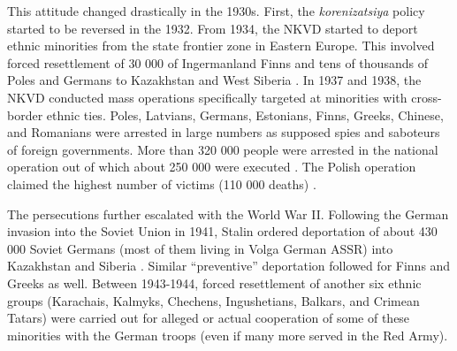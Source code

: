 This attitude changed drastically in the 1930s.
First, the  \emph{korenizatsiya} policy started to be reversed in the 1932.
From 1934, the NKVD started to deport ethnic minorities from the state frontier zone in Eastern Europe. This involved forced resettlement of  30 000 of Ingermanland Finns and tens of thousands of Poles and Germans to  Kazakhstan and West Siberia  \citep[p. 95]{polian_against_2003}.
In 1937 and 1938, the NKVD conducted mass operations specifically
targeted at minorities with cross-border ethnic ties. 
Poles, Latvians, Germans, Estonians, Finns, Greeks, Chinese, and Romanians were arrested in large numbers as supposed spies and saboteurs of foreign governments.
More than 320 000 people were arrested in the national operation out of which about 250 000 were executed \citep[p. 855]{martin_origins_1998}. The Polish operation claimed the highest number of victims (110 000 deaths) . %

The persecutions  further escalated with the World War II. Following the German invasion into the Soviet Union in 1941, Stalin ordered deportation of about 430 000 Soviet Germans (most of them living in Volga German ASSR)  into Kazakhstan and Siberia \citep[p. 134]{polian_against_2003}. Similar \enquote{preventive} deportation followed for  Finns and Greeks as well. Between 1943-1944, forced resettlement of another six ethnic groups (Karachais, Kalmyks, Chechens, Ingushetians, Balkars, and Crimean Tatars) were carried out for alleged or actual cooperation of some of these minorities with the German troops (even if many more served in the Red Army). 
